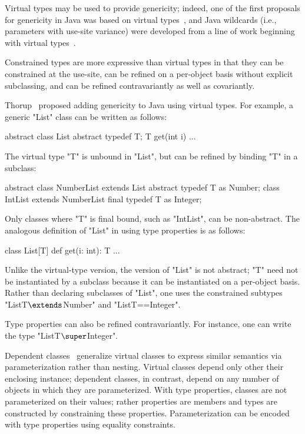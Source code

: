 Virtual types
may be used to provide genericity; indeed,
one of the first proposals for genericity in Java was based on
virtual types~\cite{thorup97}, and
Java
wildcards (i.e., parameters with use-site variance)
were developed from a line of work beginning with virtual
types~\cite{unifying-genericity,variant-parametric-types,adding-wildcards}.


Constrained types are more expressive than virtual
types in that they can be constrained at the use-site,
can be refined on a per-object basis without explicit subclassing,
and can be refined contravariantly as well as covariantly.

Thorup~\cite{thorup97}
proposed adding genericity to Java using virtual types.  For example,
a generic \xcd"List" class can be written as follows:
{
\begin{xten}
abstract class List {
  abstract typedef T;
  T get(int i) { ... }
}
\end{xten}}
\noindent
The virtual type \xcd"T" is unbound in \xcd"List", but 
can be refined by binding \xcd"T" in a subclass:
{
\begin{xten}
abstract class NumberList extends List {
  abstract typedef T as Number;
}
class IntList extends NumberList {
  final typedef T as Integer;
}
\end{xten}}
\noindent
Only classes where \xcd"T" is final bound, such as \xcd"IntList",
can be non-abstract.
%
The analogous definition of 
\xcd"List" in \Xten{} using type properties is as follows:
{
\begin{xten}
class List[T] {
  def get(i: int): T { ... }
}
\end{xten}}

\noindent
Unlike the virtual-type version,
the \Xten{} version of \xcd"List" is not abstract;
\xcd"T" need not be instantiated by a subclass because it can be
instantiated on a per-object basis.
Rather than declaring subclasses of \xcd"List",
one uses the constrained subtypes
\xcdmath"List{T$\extends$Number}" and \xcd"List{T==Integer}".

Type properties can also be refined contravariantly.
For instance, one can write the type \xcdmath"List{T$\super$Integer}".

Dependent classes~\cite{dependent-classes} generalize virtual
classes to express similar semantics via parameterization rather
than nesting.  Virtual classes depend only other their enclosing
instance; dependent classes, in contrast, depend on any number
of objects in which they are parameterized.  With type
properties, classes are not parameterized on their values;
rather properties are members and types are constructed by
constraining these properties.  Parameterization can be 
encoded with type properties using equality constraints.

